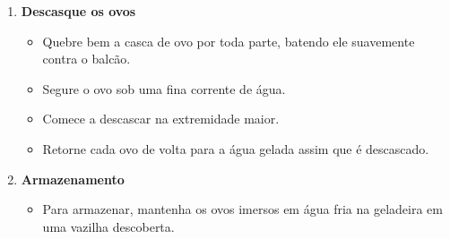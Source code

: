 \documentclass [11pt, letterpaper] {article}
\begin{document}
\begin {description}
\begin {enumerate}
\begin {itemize}
\item Quebre as cascas suavemente em vários lugares e submerja os ovos na água gelada.
\item Deixe os ovos na água gelada por 15 a 20 minutos antes de descascar
\end {itemize}
\item {\bf Descasque os ovos}
\begin {itemize}
\item Quebre bem a casca de ovo por toda parte, batendo ele suavemente contra o balcão.
\item Segure o ovo sob uma fina corrente de água.
\item Comece a descascar na extremidade maior.
\item Retorne cada ovo de volta para a água gelada assim que é descascado.
\end {itemize}
\item {\bf Armazenamento}
\begin {itemize}
\item Para armazenar, mantenha os ovos imersos em água fria na geladeira em uma vazilha descoberta.
\end {itemize}
\end {enumerate}
\end {description}
\end{document}
